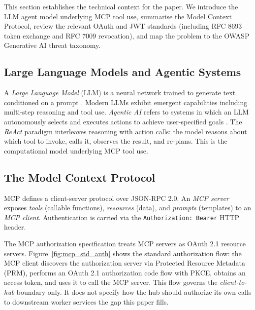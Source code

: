 \documentclass[journal]{IEEEtran}
\begin{document}
This section establishes the technical context for the paper. We introduce the
LLM agent model underlying MCP tool use, summarise the Model Context Protocol,
review the relevant OAuth and JWT standards (including RFC 8693 token exchange
and RFC 7009 revocation), and map the problem to the OWASP Generative AI threat
taxonomy.

\subsection{Large Language Models and Agentic Systems}

A \textit{Large Language Model} (LLM) is a neural network trained to generate
text conditioned on a prompt \cite{vaswani2017}. Modern LLMs exhibit emergent
capabilities including multi-step reasoning and tool use. \textit{Agentic AI}
refers to systems in which an LLM autonomously selects and executes actions to
achieve user-specified goals \cite{wang2024survey}. The \textit{ReAct} paradigm
\cite{yao2022react} interleaves reasoning with action calls: the model reasons
about which tool to invoke, calls it, observes the result, and re-plans. This
is the computational model underlying MCP tool use.

\subsection{The Model Context Protocol}

MCP \cite{mcp_spec} defines a client-server protocol over JSON-RPC 2.0. An
\textit{MCP server} exposes \textit{tools} (callable functions), \textit{resources}
(data), and \textit{prompts} (templates) to an \textit{MCP client}. Authentication
is carried via the \texttt{Authorization: Bearer} HTTP header.

The MCP authorization specification \cite{mcp_spec_2025} treats MCP servers as
OAuth 2.1 resource servers. Figure~\ref{fig:mcp_std_auth} shows the standard
authorization flow: the MCP client discovers the authorization server via
Protected Resource Metadata (PRM), performs an OAuth 2.1 authorization code flow
with PKCE, obtains an access token, and uses it to call the MCP server. This flow
governs the \textit{client-to-hub} boundary only. It does not specify how the hub
should authorize its own calls to downstream worker services the gap this paper
fills.
\end{document}

